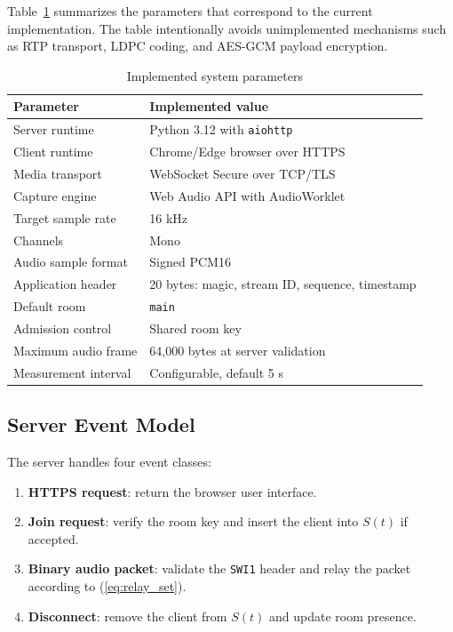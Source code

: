\documentclass[conference]{IEEEtran}
\begin{document}
Table~\ref{tab:parameters} summarizes the parameters that correspond to the current implementation. The table intentionally avoids unimplemented mechanisms such as RTP transport, LDPC coding, and AES-GCM payload encryption.

\begin{table}[H]
\centering
\caption{Implemented system parameters}
\label{tab:parameters}
\renewcommand{\arraystretch}{1.15}
\begin{tabularx}{\columnwidth}{lX}
\toprule
\textbf{Parameter} & \textbf{Implemented value} \\
\midrule
Server runtime & Python 3.12 with \texttt{aiohttp} \\
Client runtime & Chrome/Edge browser over HTTPS \\
Media transport & WebSocket Secure over TCP/TLS \\
Capture engine & Web Audio API with AudioWorklet \\
Target sample rate & 16 kHz \\
Channels & Mono \\
Audio sample format & Signed PCM16 \\
Application header & 20 bytes: magic, stream ID, sequence, timestamp \\
Default room & \texttt{main} \\
Admission control & Shared room key \\
Maximum audio frame & 64,000 bytes at server validation \\
Measurement interval & Configurable, default 5 s \\
\bottomrule
\end{tabularx}
\end{table}

\subsection{Server Event Model}

The server handles four event classes:
\begin{enumerate}
    \item \textbf{HTTPS request}: return the browser user interface.
    \item \textbf{Join request}: verify the room key and insert the client into $S(t)$ if accepted.
    \item \textbf{Binary audio packet}: validate the \texttt{SWI1} header and relay the packet according to (\ref{eq:relay_set}).
    \item \textbf{Disconnect}: remove the client from $S(t)$ and update room presence.
\end{enumerate}
\end{document}
